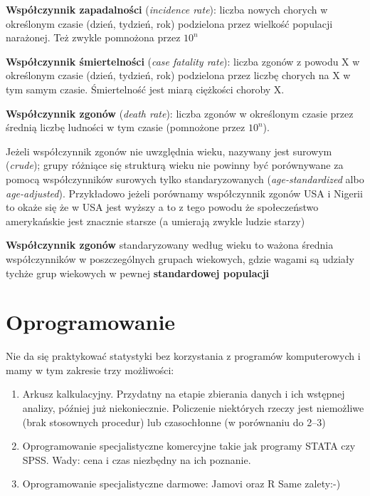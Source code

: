 \documentclass[
  openany]{book}
\begin{document}
\textbf{Współczynnik zapadalności} (\emph{incidence rate}): liczba nowych chorych w określonym czasie (dzień, tydzień, rok) podzielona przez wielkość populacji narażonej. Też zwykle pomnożona przez \(10^n\)

\textbf{Współczynnik śmiertelności} (\emph{case fatality rate}): liczba zgonów z powodu X w określonym czasie (dzień, tydzień, rok) podzielona
przez liczbę chorych na X w tym samym czasie. Śmiertelność jest miarą ciężkości choroby X.

\textbf{Współczynnik zgonów} (\emph{death rate}): liczba zgonów w określonym czasie przez średnią
liczbę ludności w tym czasie (pomnożone przez \(10^n\)).

Jeżeli współczynnik zgonów nie uwzględnia wieku, nazywany jest surowym (\emph{crude}); grupy różniące się strukturą wieku
nie powinny być porównywane za pomocą współczynników surowych tylko standaryzowanych (\emph{age-standardized} albo
\emph{age-adjusted}). Przykładowo jeżeli porównamy współczynnik zgonów USA i Nigerii to okaże się że w USA jest wyższy
a to z tego powodu że społeczeństwo amerykańskie jest znacznie starsze (a umierają zwykle ludzie starzy)

\textbf{Współczynnik zgonów} standaryzowany według wieku to ważona średnia współczynników w poszczególnych
grupach wiekowych, gdzie wagami są udziały tychże grup wiekowych w pewnej \textbf{standardowej populacji}

\hypertarget{oprogramowanie}{%
\section{Oprogramowanie}\label{oprogramowanie}}

Nie da się praktykować statystyki bez korzystania z programów komputerowych
i mamy w tym zakresie trzy możliwości:

\begin{enumerate}
\def\labelenumi{\arabic{enumi}.}
\item
  Arkusz kalkulacyjny. Przydatny na etapie zbierania danych i ich wstępnej
  analizy, później już niekoniecznie. Policzenie niektórych rzeczy jest niemożliwe
  (brak stosownych procedur) lub czasochłonne (w porównaniu do 2--3)
\item
  Oprogramowanie specjalistyczne komercyjne takie jak programy STATA czy SPSS.
  Wady: cena i czas niezbędny na ich poznanie.
\item
  Oprogramowanie specjalistyczne darmowe: Jamovi oraz R
  Same zalety:-)
\end{enumerate}
\end{document}
